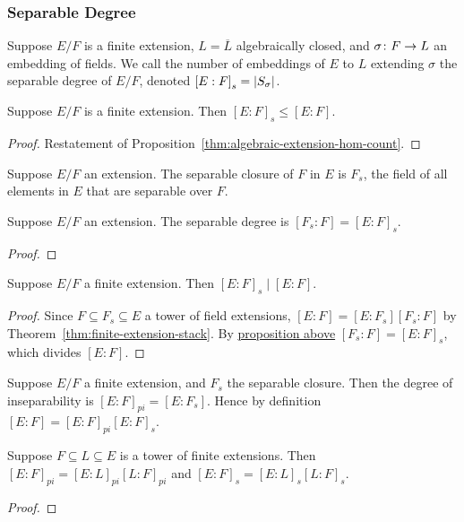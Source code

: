 \subsubsection*{Separable Degree}

\begin{definition}
    Suppose \(E/F\) is a finite extension,
    \(L = \overline{L}\) algebraically closed,
    and \(\sigma\colon F\to L\) an embedding of fields.
    We call the number of embeddings of \(E\) to \(L\) extending \(\sigma\)
    the separable degree of \(E/F\),
    denoted \({[E:F]}_s = \abs{S_\sigma}\).
\end{definition}
\begin{corollary}
    Suppose \(E/F\) is a finite extension.
    Then \({[E:F]}_s \leq [E:F]\).
\end{corollary}
\begin{proof}
    Restatement of Proposition~\ref{thm:algebraic-extension-hom-count}.
\end{proof}

\begin{definition}
    Suppose \(E/F\) an extension.
    The separable closure of \(F\) in \(E\) is \(F_s\),
    the field of all elements in \(E\) that are separable over \(F\).
\end{definition}
\begin{proposition}\label{prop:separable-degree}
    Suppose \(E/F\) an extension.
    The separable degree is \([F_s:F] = {[E:F]}_s\).
\end{proposition}
\begin{proof}
\end{proof}
\begin{corollary}
    Suppose \(E/F\) a finite extension.
    Then \({[E:F]}_s \mid [E:F]\).
\end{corollary}
\begin{proof}
    Since \(F \subseteq F_s \subseteq E\) a tower of field extensions,
    \([E:F] = [E:F_s][F_s:F]\) by Theorem~\ref{thm:finite-extension-stack}.
    By \hyperref[prop:separable-degree]{proposition above}
    \([F_s:F] = {[E:F]}_s\), which divides \([E:F]\).
\end{proof}

\begin{definition}
    Suppose \(E/F\) a finite extension,
    and \(F_s\) the separable closure.
    Then the degree of inseparability is \({[E:F]}_{pi} = [E:F_s]\).
    Hence by definition \([E:F] = {[E:F]}_{pi}{[E:F]}_s\).
\end{definition}
\begin{proposition}
    Suppose \(F \subseteq L \subseteq E\) is a tower of finite extensions.
    Then \({[E:F]}_{pi} = {[E:L]}_{pi}{[L:F]}_{pi}\)
    and \({[E:F]}_s = {[E:L]}_s{[L:F]}_s\).
\end{proposition}
\begin{proof}
\end{proof}

